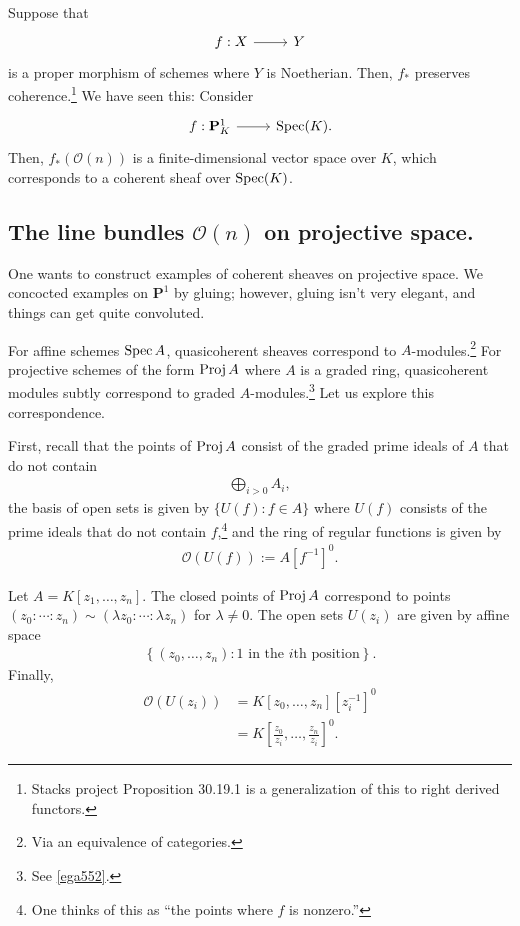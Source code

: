\documentclass [11 pt, oneside] {article}
\begin{document}
Suppose that
\[
\begin{tikzcd}
f:X\ar[r]&Y
\end{tikzcd}
\]
is a proper morphism of schemes where $Y$ is Noetherian. Then, $f_*$ preserves coherence.\footnote{Stacks project Proposition 30.19.1 is a generalization of this to right derived functors.} We have seen this: Consider 
\[
\begin{tikzcd}
f:\mathbf{P}^1_K\ar[r]&\Spec(K).
\end{tikzcd}
\]
Then, $f_*(\mathscr{O}(n))$ is a finite-dimensional vector space over $K$, which corresponds to a coherent sheaf over $\operatorname{Spec} (K)$.

\subsection{The line bundles \texorpdfstring{$\mathscr O(n)$}{O(n)} on projective space.}

One wants to construct examples of coherent sheaves on projective space. We concocted examples on $\mathbf{P}^1$ by gluing; however, gluing isn't very elegant, and things can get quite convoluted. 

For affine schemes $\operatorname{Spec} A$, quasicoherent sheaves correspond to $A$-modules.\footnote{Via an equivalence of categories.}
For projective schemes of the form $\operatorname{Proj} A$ where $A$ is a graded ring, quasicoherent modules subtly correspond to graded $A$-modules.\footnote{See \cref{ega552}.} Let us explore this correspondence.

First, recall that the points of $\operatorname{Proj} A$ consist of the graded prime ideals of $A$ that do not contain
\begin{align*}
	\bigoplus_{i>0}A_i,
\end{align*}
the basis of open sets is given by $\{U(f):f\in A\}$ where $U(f)$ consists of the prime ideals that do not contain $f$,\footnote{One thinks of this as ``the points where $f$ is nonzero.''} and the ring of regular functions is given by
\begin{align*}
	\mathscr{O}(U(f)) := A[f^{-1}]^0.
\end{align*}
\begin{example}[ ]\label{}\text{}
Let $A = K[z_1,\hdots,z_n]$. The closed points of $\operatorname{Proj} A$ correspond to points $(z_0:\cdots:z_n)\sim (\lambda z_0:\cdots:\lambda z_n)$ for $\lambda\ne 0$. The open sets $U(z_i)$ are given by affine space
\begin{align*}
	\left\{ (z_0,\hdots,z_n) : \textrm{$1$ in the $i$th position} \right\}. 
\end{align*}
Finally,
\begin{align*}
	\mathscr{O}(U(z_i)) &= K[z_0,\hdots, z_n][z_i^{-1}]^0\\
			    &= K \left[ \frac{z_0}{z_i},\hdots, \frac{z_n}{z_i} \right]^0. 
\end{align*}
\end{example}
\end{document}

